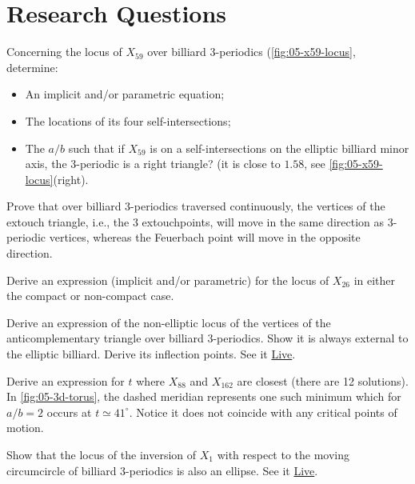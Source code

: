\section{Research Questions}

\begin{question}
Concerning the locus of $X_{59}$ over billiard 3-periodics (\cref{fig:05-x59-locus}, determine:
\begin{itemize}
\item An implicit and/or parametric equation;
\item The locations of its four self-intersections;
\item The $a/b$ such that if $X_{59}$ is on a self-intersections on the elliptic billiard minor axis, the 3-periodic is a right triangle? (it is close to $1.58$, see \cref{fig:05-x59-locus}(right).
\end{itemize}
\end{question}

\begin{question}
Prove that over billiard 3-periodics traversed continuously, the vertices of the extouch triangle, i.e., the 3 extouchpoints, will move in the same direction as 3-periodic vertices, whereas the Feuerbach point will move in the opposite direction.  
\end{question}

\begin{question}
Derive an expression (implicit and/or parametric) for the locus of $X_{26}$ in either the compact or non-compact case.
\end{question}

\begin{question}
Derive an expression of the non-elliptic locus of the vertices of the anticomplementary triangle over billiard 3-periodics. Show it is always external to the elliptic billiard. Derive its inflection points. See it \href{https://bit.ly/2RtUT00}{Live}.
\end{question}

\begin{question}
\label{que:05-x88-x162}
Derive an expression for $t$ where $X_{88}$ and $X_{162}$ are closest (there are 12 solutions). In \cref{fig:05-3d-torus}, the dashed meridian represents one such minimum which for $a/b=2$ occurs at $t{\simeq}41^\circ$. Notice it does not coincide with any critical points of motion.
\end{question}

\begin{question}
Show that the locus of the inversion of $X_1$ with respect to the moving circumcircle of billiard 3-periodics is also an ellipse. See it \href{https://bit.ly/3ujusan}{Live}.
\end{question}

